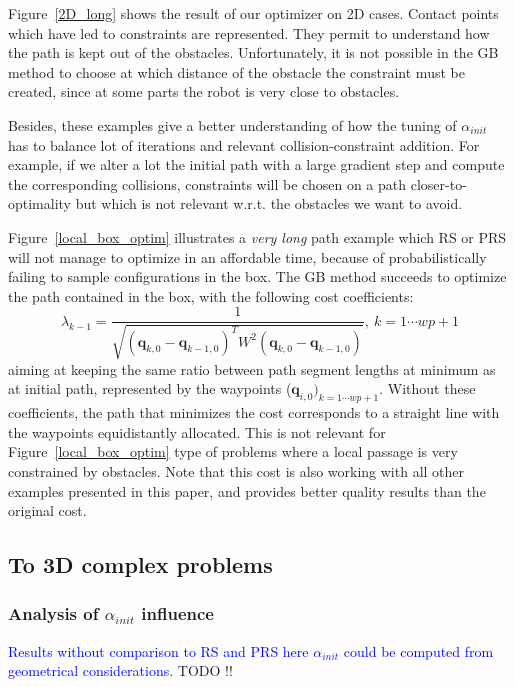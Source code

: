 \documentclass{tADR2e}
\newcommand\conf{\mathbf{q}}
\newcommand\weight{W}
\begin{document}
Figure~\ref{2D_long} shows the result of our optimizer on 2D cases. Contact points which have 
led to constraints are represented. They permit to understand how the path is kept out of the obstacles. 
Unfortunately, it is not possible in the GB method to choose at which distance of the obstacle 
the constraint must be created, since at some parts the robot is very close to obstacles.

Besides, these examples give a better understanding of how the tuning of 
$\alpha_{init}$ 
has to balance lot of iterations and relevant collision-constraint addition. For 
example, if we alter a lot the initial path with a large gradient step and 
compute the corresponding collisions, constraints will be chosen on a 
path closer-to-optimality but which is not relevant
w.r.t. the obstacles we want to avoid.

Figure~\ref{local_box_optim} illustrates a \textit{very long} path example which RS 
or PRS will not manage to 
optimize in an affordable time, because of probabilistically failing to sample 
configurations in the box. The GB method succeeds to optimize the 
path contained in the box, with the following cost coefficients:
$$
\lambda_{k-1} = \frac{1}{\sqrt{(\conf_{k,0}-\conf_{k-1,0})^T \weight^2 
(\conf_{k,0}-\conf_{k-1,0})}}, \  k=1\cdots wp+1  
$$
aiming at keeping the same ratio between path segment lengths at 
minimum as at 
initial path, represented by the waypoints ($\conf_{i,0})_{k=1\cdots wp+1}$.
Without these coefficients, the path that minimizes the cost corresponds to a 
straight line with the waypoints equidistantly allocated. This is not relevant for 
Figure~\ref{local_box_optim} type of problems where a local passage is very
constrained by obstacles. Note that this cost is also working with all other 
examples presented in this paper, and provides better quality results than the original cost.



\subsection{To 3D complex problems}

\subsubsection{Analysis of $\alpha_{init}$ influence}
\textcolor{blue}{Results without comparison to RS and PRS here
$\alpha_{init}$ could be computed from geometrical considerations.
}
TODO !!
\end{document}
